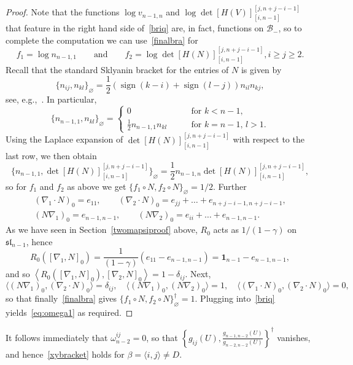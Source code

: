 \documentclass{amsart}
\theoremstyle{definition}
\theoremstyle{remark}
\numberwithin{equation}{section}
\numberwithin{theorem}{section}
\def\B{{\mathcal B}}
\def\one{\mathbf 1}
\def\sl{\mathfrak {sl}}
\def\sign{{\operatorname{sign}}}
\begin{document}
\begin{proof}
Note that the functions $\log v_{n-1,n}$ and $\log\det[H(V)]_{[i,n-1]}^{[j,n+j-i-1]}$ that feature in the right hand side of~\eqref{briq} are, in fact, functions on $\B_-$, so to complete the computation we can use~\eqref{finalbra} for $$
f_1=\log n_{n-1,1}\qquad \text{and}\qquad f_2=\log\det[H(N)]_{[i,n-1]}^{[j,n+j-i-1]}, i\ge j\ge 2.
$$
 Recall that the standard Sklyanin bracket for the entries of $N$ is given by
\[
\{n_{ij},n_{kl}\}_\varnothing=\frac12(\sign(k-i)+\sign(l-j))n_{il}n_{kj},
\]
see, e.g.,~\cite[p.~12]{GSVb}. In particular,
\[
\{n_{n-1,1},n_{kl}\}_\varnothing=\begin{cases} 0\qquad &\text{for $k<n-1$,}\\
\frac12n_{n-1,1}n_{kl}\qquad &\text{for $k=n-1$, $l>1$.} \end{cases}
\]
Using the Laplace expansion of $\det[H(N)]_{[i,n-1]}^{[j,n+j-i-1]}$ with respect to the last row, we then obtain
\[
\{n_{n-1,1},\det[H(N)]_{[i,n-1]}^{[j,n+j-i-1]}\}_\varnothing=\frac12n_{n-1,n}\det[H(N)]_{[i,n-1]}^{[j,n+j-i-1]},
\]
so for $f_1$ and $f_2$ as above we get $\{f_1\circ N,f_2\circ N\}_\varnothing=1/2$. Further
\begin{gather*}
(\nabla_1{\cdot}N)_0=e_{11}, \qquad (\nabla_2{\cdot}N)_0=e_{jj}+\dots+e_{n+j-i-1,n+j-i-1},\\
(N\nabla_1)_0=e_{n-1,n-1}, \qquad (N\nabla_2)_0=e_{ii}+\dots+e_{n-1,n-1}.
\end{gather*}
As we have seen in Section~\ref{twomapsiproof} above, $R_0$ acts as $1/(1-\gamma)$ on $\sl_{n-1}$, hence
\[
R_0([\nabla_1,N]_0)=\frac1{(1-\gamma)}(e_{11}-e_{n-1,n-1})=\one_{n-1}-e_{n-1,n-1},
\]
and so $\left\langle R_0([\nabla_1,N]_0),[\nabla_2,N]_0\right\rangle=1-\delta_{ij}$. Next,
\[
\langle (N\nabla_1)_0,(\nabla_2{\cdot} N)_0\rangle=\delta_{ij},\quad
\langle (N\nabla_1)_0,(N\nabla_2)_0\rangle=1,\quad
\langle(\nabla_1{\cdot} N)_0,(\nabla_2{\cdot} N)_0\rangle=0,
\]
so that finally~\eqref{finalbra} gives $\{f_1\circ N,f_2\circ N\}_\varnothing^\dag=1$. Plugging into~\eqref{briq} 
yields~\eqref{eq:omega1} as required.
\end{proof}

It follows immediately that $\omega_{n-2}^{ij}=0$, so that $\left\{g_{ij}(U),\frac{g_{n-1,n-2}(U)}{g_{n-2,n-2}(U)}\right\}^\dag$ vanishes, and hence~\eqref{xybracket} holds for $\beta=\langle i,j\rangle\ne D$.
\end{document}
